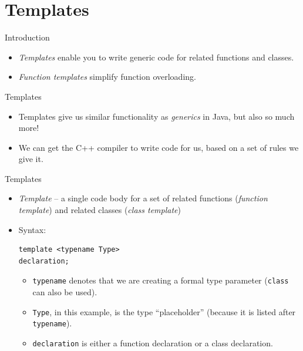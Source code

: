 \documentclass[14pt,aspectratio=1610, hyperref={pdfpagelayout=SinglePage}]{beamer}
\begin{document}
\section{Templates}

\begin{frame}{Introduction}
  \begin{itemize}
  \item
    \emph{Templates} enable you to write generic code for related
    functions and classes.
  \item
    \emph{Function templates} simplify function overloading.
  \end{itemize}
\end{frame}

\begin{frame}{Templates}

\begin{itemize}
\item
  Templates give us similar functionality as \textit{generics} in Java, but
  also so much more!
\item
  We can get the C++ compiler to write code for us, based on a set of rules we
  give it.
\end{itemize}
\end{frame}

\begin{frame}[fragile]{Templates}
\protect\hypertarget{templates-1-of-2}{}
\begin{itemize}
\item
  \emph{Template} -- a single code body for a set of related functions
  (\emph{function template}) and related classes (\emph{class template})
\item
  Syntax:
\begin{lstlisting}
template <typename Type>
declaration;
\end{lstlisting}
  \begin{itemize}
  \item
    \lstinline{typename} denotes that we are creating a formal type parameter
    (\lstinline{class} can also be used).
  \item
    \lstinline{Type}, in this example, is the type ``placeholder'' (because it is listed after
    \lstinline{typename}).
  \item
    \lstinline{declaration} is either a function declaration or a class
    declaration.
  \end{itemize}
\end{itemize}
\end{frame}
\end{document}
